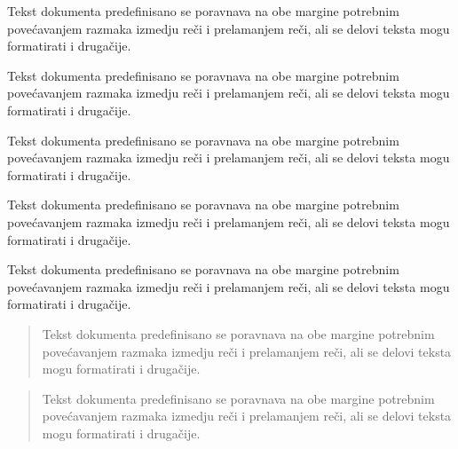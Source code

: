 \documentclass{article}
\begin{document}
Tekst dokumenta predefinisano se poravnava na obe margine
potrebnim povećavanjem razmaka izmedju reči i prelamanjem reči, ali
se delovi teksta mogu formatirati i drugačije.

{\raggedright
Tekst dokumenta predefinisano se poravnava na obe margine
potrebnim povećavanjem razmaka izmedju reči i prelamanjem reči, ali
se delovi teksta mogu formatirati i drugačije. \\
}

\begin{flushleft}
Tekst dokumenta predefinisano se poravnava na obe margine
potrebnim povećavanjem razmaka izmedju reči i prelamanjem reči, ali
se delovi teksta mogu formatirati i drugačije. 
\end{flushleft}

\begin{flushright}
Tekst dokumenta predefinisano se poravnava na obe margine
potrebnim povećavanjem razmaka izmedju reči i prelamanjem reči, ali
se delovi teksta mogu formatirati i drugačije.
\end{flushright}

\begin{center}
Tekst dokumenta predefinisano se poravnava na obe margine
potrebnim povećavanjem razmaka izmedju reči i prelamanjem reči, ali
se delovi teksta mogu formatirati i drugačije.
\end{center}

\vspace*{1cm}

\begin{quote}
Tekst dokumenta predefinisano se poravnava na obe margine
potrebnim povećavanjem razmaka izmedju reči i prelamanjem reči, ali
se delovi teksta mogu formatirati i drugačije.
\end{quote}

\begin{quotation}
Tekst dokumenta predefinisano se poravnava na obe margine
potrebnim povećavanjem razmaka izmedju reči i prelamanjem reči, ali
se delovi teksta mogu formatirati i drugačije.
\end{quotation}
\end{document}
